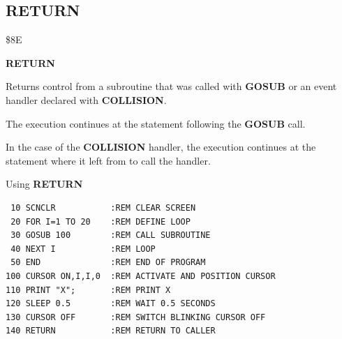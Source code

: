 \subsection{RETURN}
\begin{description}[leftmargin=2cm,style=nextline]
\item [Token:] \$8E
\item [Format:] {\bf RETURN}
\item [Usage:]  Returns control from a subroutine that
                was called with {\bf GOSUB} or an event
                handler declared with {\bf COLLISION}.

                The execution continues at the statement
                following the {\bf GOSUB} call.

                In the case of the {\bf COLLISION} handler,
                the execution continues at the statement
                where it left from to call the handler.

\item [Example:] Using {\bf RETURN}

\begin{tcolorbox}[colback=black,coltext=white]
\verbatimfont{\codefont}
\begin{verbatim}
 10 SCNCLR           :REM CLEAR SCREEN
 20 FOR I=1 TO 20    :REM DEFINE LOOP
 30 GOSUB 100        :REM CALL SUBROUTINE
 40 NEXT I           :REM LOOP
 50 END              :REM END OF PROGRAM
100 CURSOR ON,I,I,0  :REM ACTIVATE AND POSITION CURSOR
110 PRINT "X";       :REM PRINT X
120 SLEEP 0.5        :REM WAIT 0.5 SECONDS
130 CURSOR OFF       :REM SWITCH BLINKING CURSOR OFF
140 RETURN           :REM RETURN TO CALLER
\end{verbatim}
\end{tcolorbox}
\end{description}


\newpage
